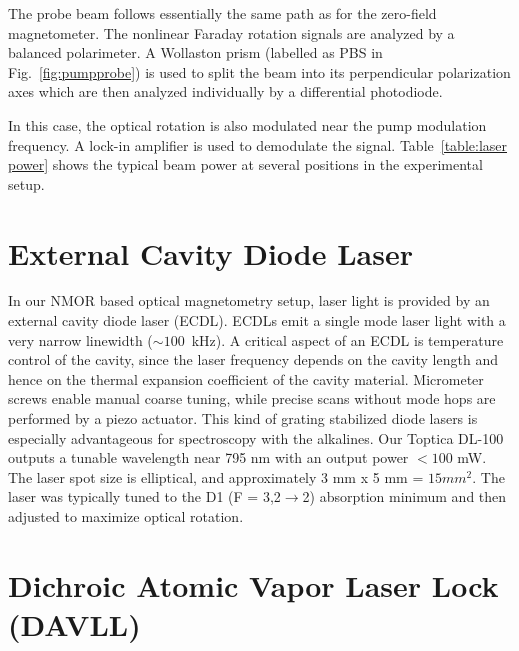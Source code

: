 The probe beam follows essentially the same path as for the zero-field
magnetometer.  The nonlinear Faraday rotation signals are analyzed by
a balanced polarimeter.  A Wollaston prism (labelled as PBS in
Fig.~\ref{fig:pumpprobe}) is used to split the beam into its
perpendicular polarization axes which are then analyzed individually
by a differential photodiode.

In this case, the optical rotation is also modulated near the pump
modulation frequency.  A lock-in amplifier is used to demodulate the
signal. Table~\ref{table:laser power} shows the typical beam power at
several positions in the experimental setup.



\section{External Cavity Diode Laser}

In our NMOR based optical magnetometry setup, laser light is provided
by an external cavity diode laser (ECDL).  
ECDLs emit a single mode laser light with a very narrow linewidth
($\sim 100$~kHz).  A critical aspect of an ECDL is temperature control
of the cavity, since the laser frequency depends on the cavity length
and hence on the thermal expansion coefficient of the cavity
material. Micrometer screws enable manual coarse tuning, while precise
scans without mode hops are performed by a piezo actuator. This kind
of grating stabilized diode lasers is especially advantageous for
spectroscopy with the alkalines. Our Toptica DL-100 outputs a tunable
wavelength near 795 nm with an output power $<100$ mW. The laser spot
size is elliptical, and approximately 3 mm x 5 mm = $15 mm^2$.  The
laser was typically tuned to the D1 (F = 3,2$\rightarrow$2) absorption
minimum and then adjusted to maximize optical rotation.

\section{Dichroic Atomic Vapor Laser Lock (DAVLL)}

